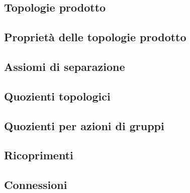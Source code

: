 \documentclass{article}
\begin{document}
\subsection{Topologie prodotto}


\subsection{Proprietà delle topologie prodotto}


\subsection{Assiomi di separazione}


\subsection{Quozienti topologici}


\subsection{Quozienti per azioni di gruppi}


\subsection{Ricoprimenti}


\subsection{Connessioni}

\end{document}
